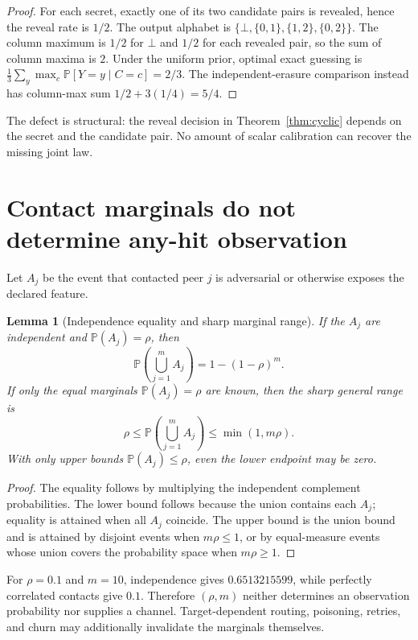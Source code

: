 \documentclass[11pt]{article}
\newcommand{\Prb}{\mathbb{P}}
\newtheorem{lemma}{Lemma}
\begin{document}
\begin{proof}
For each secret, exactly one of its two candidate pairs is revealed, hence the reveal rate is \(1/2\). The output alphabet is \(\{\bot,\{0,1\},\{1,2\},\{0,2\}\}\). The column maximum is \(1/2\) for \(\bot\) and \(1/2\) for each revealed pair, so the sum of column maxima is \(2\). Under the uniform prior, optimal exact guessing is \(\frac13\sum_y\max_c\Prb[Y=y\mid C=c]=2/3\). The independent-erasure comparison instead has column-max sum \(1/2+3(1/4)=5/4\).
\end{proof}

The defect is structural: the reveal decision in Theorem~\ref{thm:cyclic} depends on the secret and the candidate pair. No amount of scalar calibration can recover the missing joint law.

\section{Contact marginals do not determine any-hit observation}\label{sec:contacts}
Let \(A_j\) be the event that contacted peer \(j\) is adversarial or otherwise exposes the declared feature.

\begin{lemma}[Independence equality and sharp marginal range]\label{lem:contacts}
If the \(A_j\) are independent and \(\Prb(A_j)=\rho\), then
\[
\Prb\!\left(\bigcup_{j=1}^{m} A_j\right)=1-(1-\rho)^m.
\]
If only the equal marginals \(\Prb(A_j)=\rho\) are known, then the sharp general range is
\[
\rho\le \Prb\!\left(\bigcup_{j=1}^{m} A_j\right)\le\min(1,m\rho).
\]
With only upper bounds \(\Prb(A_j)\le\rho\), even the lower endpoint may be zero.
\end{lemma}

\begin{proof}
The equality follows by multiplying the independent complement probabilities. The lower bound follows because the union contains each \(A_j\); equality is attained when all \(A_j\) coincide. The upper bound is the union bound and is attained by disjoint events when \(m\rho\le1\), or by equal-measure events whose union covers the probability space when \(m\rho\ge1\).
\end{proof}

For \(\rho=0.1\) and \(m=10\), independence gives \(0.6513215599\), while perfectly correlated contacts give \(0.1\). Therefore \((\rho,m)\) neither determines an observation probability nor supplies a channel. Target-dependent routing, poisoning, retries, and churn may additionally invalidate the marginals themselves.
\end{document}
